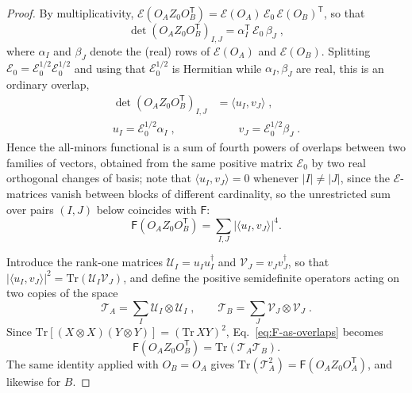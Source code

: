 \documentclass[prx,twocolumn,superscriptaddress,aps,10pt, frontmatterverbose, reprint,footinbib,longbibliography=true]{revtex4-2}
\newcommand{\trans}{\mathsf{T}}
\begin{document}
\begin{proof}
By multiplicativity, $\mathcal{E}(O_AZ_0O_B^{\trans})=\mathcal{E}(O_A)\,\mathcal{E}_0\,\mathcal{E}(O_B)^{\trans}$, so that
\begin{equation}
    \det\!\left(O_AZ_0O_B^{\trans}\right)_{I,J}=\alpha_I^{\trans}\,\mathcal{E}_0\,\beta_J\;,
\end{equation}
where $\alpha_I$ and $\beta_J$ denote the (real) rows of $\mathcal{E}(O_A)$ and $\mathcal{E}(O_B)$. Splitting $\mathcal{E}_0=\mathcal{E}_0^{1/2}\mathcal{E}_0^{1/2}$ and using that $\mathcal{E}_0^{1/2}$ is Hermitian while $\alpha_I,\beta_J$ are real, this is an ordinary overlap,
\begin{equation}
\begin{split}
    \det\!\left(O_AZ_0O_B^{\trans}\right)_{I,J}&=\langle u_I,v_J\rangle\;,\\
    u_I=\mathcal{E}_0^{1/2}\alpha_I\;,&\qquad v_J=\mathcal{E}_0^{1/2}\beta_J\;.
\end{split}
    \label{eq:minors-as-overlaps}
\end{equation} 
Hence the all-minors functional is a sum of fourth powers of overlaps between two families of vectors, obtained from the same positive matrix $\mathcal{E}_0$ by two real orthogonal changes of basis; note that $\langle u_I,v_J\rangle=0$ whenever $|I|\neq|J|$, since the $\mathcal{E}$-matrices vanish between blocks of different cardinality, so the unrestricted sum over pairs $(I,J)$ below coincides with $\mathsf{F}$:
\begin{equation}
    \mathsf{F}\!\left(O_AZ_0O_B^{\trans}\right)=\sum_{I,J}\left|\langle u_I,v_J\rangle\right|^4 .
    \label{eq:F-as-overlaps}
\end{equation}


Introduce the rank-one matrices $\mathcal{U}_I=u_Iu_I^\dagger$ and $\mathcal{V}_J=v_Jv_J^\dagger$, so that $|\langle u_I,v_J\rangle|^2=\mathrm{Tr}(\mathcal{U}_I\mathcal{V}_J)$, and define the positive semidefinite operators acting on two copies of the space
\begin{equation}
    \mathcal{T}_A=\sum_I \mathcal{U}_I\otimes \mathcal{U}_I\;,\qquad
    \mathcal{T}_B=\sum_J \mathcal{V}_J\otimes \mathcal{V}_J\;.
\end{equation} 
Since $\mathrm{Tr}\!\left[(X\otimes X)(Y\otimes Y)\right]=\left(\mathrm{Tr}\,XY\right)^2$, Eq.~\eqref{eq:F-as-overlaps} becomes
\begin{equation}
    \mathsf{F}\!\left(O_AZ_0O_B^{\trans}\right)=\mathrm{Tr}\!\left(\mathcal{T}_A\mathcal{T}_B\right).
    \label{eq:F-as-trace}
\end{equation}
The same identity applied with $O_B=O_A$ gives $\mathrm{Tr}(\mathcal{T}_A^2)=\mathsf{F}(O_AZ_0O_A^{\trans})$, and likewise for $B$.


\end{proof}
\end{document}
